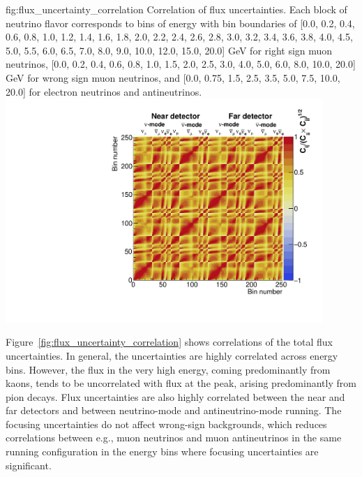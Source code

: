 \begin{dunefigure}{fig:flux_uncertainty_correlation}
{Correlation of flux uncertainties.  Each block of neutrino flavor corresponds to bins of energy with bin boundaries of
[0.0, 0.2, 0.4, 0.6, 0.8, 1.0, 1.2, 1.4, 1.6, 1.8, 2.0, 2.2, 2.4, 2.6, 2.8, 3.0, 3.2, 3.4, 3.6, 3.8, 4.0, 4.5, 5.0, 5.5, 6.0, 6.5, 7.0, 8.0, 9.0, 10.0, 12.0, 15.0, 20.0] GeV for right sign muon neutrinos, [0.0, 0.2, 0.4, 0.6, 0.8, 1.0, 1.5, 2.0, 2.5, 3.0, 4.0, 5.0, 6.0, 8.0, 10.0, 20.0] GeV for wrong sign muon neutrinos, and [0.0, 0.75, 1.5, 2.5, 3.5, 5.0, 7.5, 10.0, 20.0] for electron neutrinos and antineutrinos. }
    \includegraphics[width=0.9\textwidth]{graphics/FluxOnAxisCorrMatrix.pdf}
\end{dunefigure}

Figure~\ref{fig:flux_uncertainty_correlation} shows correlations of the total flux uncertainties.  In general, the uncertainties are highly correlated across energy bins. However, the flux in the very high energy, coming predominantly from kaons, tends to be uncorrelated with flux at the peak, %
arising predominantly from pion decays.  Flux uncertainties are also highly correlated between the near and far detectors and between neutrino-mode and antineutrino-mode running.  The focusing uncertainties do not affect wrong-sign backgrounds, which reduces correlations between e.g., muon neutrinos and muon antineutrinos in the same running configuration in the energy bins where focusing uncertainties are significant.    

